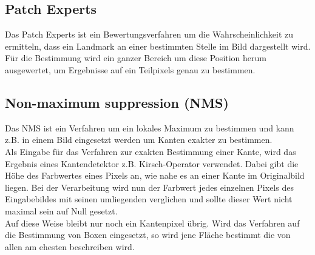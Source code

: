 \subsection{Patch Experts}
Das Patch Experts ist ein Bewertungsverfahren um die Wahrscheinlichkeit zu ermitteln, dass ein Landmark an einer bestimmten Stelle im Bild dargestellt wird. Für die Bestimmung wird ein ganzer Bereich um diese Position herum ausgewertet, um Ergebnisse auf ein Teilpixels genau zu bestimmen.
\cite{CLNF}
\subsection{Non-maximum suppression  (NMS)}
Das NMS ist ein Verfahren um ein lokales Maximum zu bestimmen und kann z.B. in einem Bild eingesetzt werden um Kanten exakter zu bestimmen.\\
Als Eingabe für das Verfahren zur exakten Bestimmung einer Kante, wird das Ergebnis eines Kantendetektor z.B. Kirsch-Operator verwendet. Dabei gibt die Höhe des Farbwertes eines Pixels an, wie nahe es an einer Kante im Originalbild liegen. Bei der Verarbeitung wird nun der Farbwert jedes einzelnen Pixels des Eingabebildes mit seinen umliegenden verglichen und sollte dieser Wert nicht maximal sein auf Null gesetzt.\\
Auf diese Weise bleibt nur noch ein Kantenpixel übrig. Wird das Verfahren auf die Bestimmung von Boxen eingesetzt, so wird jene Fläche bestimmt die von allen am ehesten beschreiben wird.
\cite{NMS}\cite{wiki_Canny}
